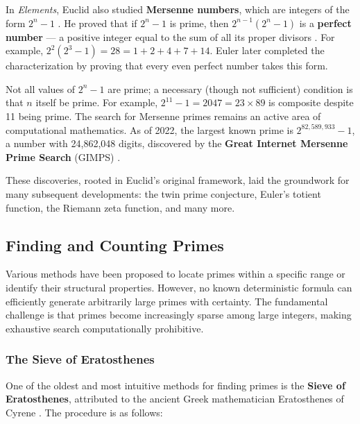 \documentclass[11pt]{article}
\theoremstyle{plain}
\theoremstyle{definition}
\theoremstyle{remark}
\begin{document}
\par In \textit{Elements}, Euclid also studied \textbf{Mersenne numbers}, which are integers of the form $2^n - 1$ \cite{wiki_euclid_euler}. He proved that if $2^n - 1$ is prime, then $2^{n-1}(2^n - 1)$ is a \textbf{perfect number} --- a positive integer equal to the sum of all its proper divisors \cite{utm_mersenne_conjecture}. For example, $2^2(2^3 - 1) = 28 = 1 + 2 + 4 + 7 + 14$. Euler later completed the characterization by proving that every even perfect number takes this form.

\par Not all values of $2^n - 1$ are prime; a necessary (though not sufficient) condition is that $n$ itself be prime. For example, $2^{11} - 1 = 2047 = 23 \times 89$ is composite despite 11 being prime. The search for Mersenne primes remains an active area of computational mathematics. As of 2022, the largest known prime is $2^{82{,}589{,}933} - 1$, a number with 24{,}862{,}048 digits, discovered by the \textbf{Great Internet Mersenne Prime Search} (GIMPS) \cite{gimps_51st}.

\par These discoveries, rooted in Euclid's original framework, laid the groundwork for many subsequent developments: the twin prime conjecture, Euler's totient function, the Riemann zeta function, and many more.

\subsection{Finding and Counting Primes}

\par Various methods have been proposed to locate primes within a specific range or identify their structural properties. However, no known deterministic formula can efficiently generate arbitrarily large primes with certainty. The fundamental challenge is that primes become increasingly sparse among large integers, making exhaustive search computationally prohibitive.

\subsubsection{The Sieve of Eratosthenes}

\par One of the oldest and most intuitive methods for finding primes is the \textbf{Sieve of Eratosthenes}, attributed to the ancient Greek mathematician Eratosthenes of Cyrene \cite{horsley_sieve_1772}. The procedure is as follows:
\end{document}

